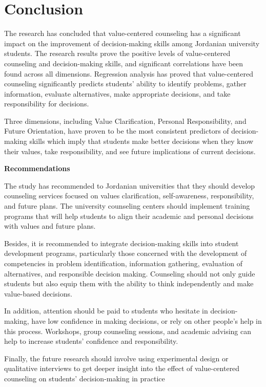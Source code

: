 \documentclass[10pt]{NSP1}
\begin{document}
\section{Conclusion}

The research has concluded that value-centered counseling has a significant impact on the improvement of decision-making skills among Jordanian university students. The research results prove the positive levels of value-centered counseling and decision-making skills, and significant correlations have been found across all dimensions. Regression analysis has proved that value-centered counseling significantly predicts students' ability to identify problems, gather information, evaluate alternatives, make appropriate decisions, and take responsibility for decisions.

Three dimensions, including Value Clarification, Personal Responsibility, and Future Orientation, have proven to be the most consistent predictors of decision-making skills which imply that students make better decisions when they know their values, take responsibility, and see future implications of current decisions.

\textbf{Recommendations}

The study has recommended to Jordanian universities that they should develop counseling services focused on values clarification, self-awareness, responsibility, and future plans. The university counseling centers should implement training programs that will help students to align their academic and personal decisions with values and future plans.

Besides, it is recommended to integrate decision-making skills into student development programs, particularly those concerned with the development of competencies in problem identification, information gathering, evaluation of alternatives, and responsible decision making. Counseling should not only guide students but also equip them with the ability to think independently and make value-based decisions.

In addition, attention should be paid to students who hesitate in decision-making, have low confidence in making decisions, or rely on other people's help in this process. Workshops, group counseling sessions, and academic advising can help to increase students' confidence and responsibility.

Finally, the future research should involve using experimental design or qualitative interviews to get deeper insight into the effect of value-centered counseling on students' decision-making in practice
\end{document}
